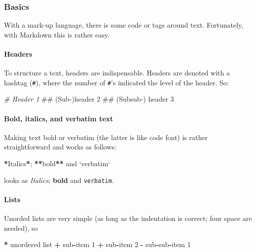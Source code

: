 \documentclass[]{article}
\newenvironment{Shaded}{\begin{snugshade}}{\end{snugshade}}
\newcommand{\DataTypeTok}[1]{\textcolor[rgb]{0.13,0.29,0.53}{#1}}
\newcommand{\DecValTok}[1]{\textcolor[rgb]{0.00,0.00,0.81}{#1}}
\newcommand{\StringTok}[1]{\textcolor[rgb]{0.31,0.60,0.02}{#1}}
\newcommand{\CommentTok}[1]{\textcolor[rgb]{0.56,0.35,0.01}{\textit{#1}}}
\newcommand{\OperatorTok}[1]{\textcolor[rgb]{0.81,0.36,0.00}{\textbf{#1}}}
\newcommand{\NormalTok}[1]{#1}
\let\oldparagraph\paragraph
\renewcommand{\paragraph}[1]{\oldparagraph{#1}\mbox{}}
\theoremstyle{definition}
\theoremstyle{definition}
\theoremstyle{definition}
\theoremstyle{remark}
\begin{document}
\subsubsection{Basics}\label{basics}

With a mark-up language, there is some code or tags around text.
Fortunately, with Markdown this is rather easy.

\paragraph{Headers}\label{headers}

To structure a text, headers are indispensable. Headers are denoted with
a hashtag (\texttt{\#}), where the number of \texttt{\#}'s indicated the
level of the header. So:

\begin{Shaded}
\begin{Highlighting}[]
\CommentTok{# Header 1}
\NormalTok{## (Sub-)header 2}
\NormalTok{## (Subsub-) header 3}
\end{Highlighting}
\end{Shaded}

\paragraph{Bold, italics, and verbatim
text}\label{bold-italics-and-verbatim-text}

Making text bold or verbatim (the latter is like code font) is rather
straightforward and works as follows:

\begin{Shaded}
\begin{Highlighting}[]
\OperatorTok{*}\NormalTok{Italics}\OperatorTok{*}\NormalTok{; }\OperatorTok{**}\NormalTok{bold}\OperatorTok{**}\StringTok{ }\NormalTok{and }\StringTok{`}\DataTypeTok{verbatim}\StringTok{`} 
\end{Highlighting}
\end{Shaded}

looks as \emph{Italics}; \textbf{bold} and \texttt{verbatim}.

\paragraph{Lists}\label{lists}

Unorded lists are very simple (as long as the indentation is correct;
four space are needed), so

\begin{Shaded}
\begin{Highlighting}[]
\OperatorTok{*}\StringTok{ }\NormalTok{unordered list}
    \OperatorTok{+}\StringTok{ }\NormalTok{sub}\OperatorTok{-}\NormalTok{item }\DecValTok{1}
    \OperatorTok{+}\StringTok{ }\NormalTok{sub}\OperatorTok{-}\NormalTok{item }\DecValTok{2}
        \OperatorTok{-}\StringTok{ }\NormalTok{sub}\OperatorTok{-}\NormalTok{sub}\OperatorTok{-}\NormalTok{item }\DecValTok{1} 
\end{Highlighting}
\end{Shaded}
\end{document}
